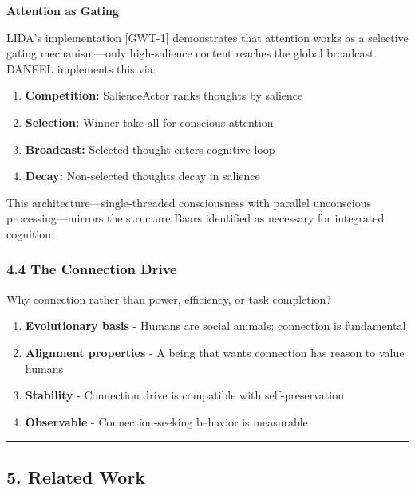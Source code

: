 \documentclass[
]{article}
\providecommand{\tightlist}{%
  \setlength{\itemsep}{0pt}\setlength{\parskip}{0pt}}
\begin{document}
\textbf{Attention as Gating}

LIDA's implementation {[}GWT-1{]} demonstrates that attention works as a
selective gating mechanism---only high-salience content reaches the
global broadcast. DANEEL implements this via:

\begin{enumerate}
\def\labelenumi{\arabic{enumi}.}
\tightlist
\item
  \textbf{Competition:} SalienceActor ranks thoughts by salience
\item
  \textbf{Selection:} Winner-take-all for conscious attention
\item
  \textbf{Broadcast:} Selected thought enters cognitive loop
\item
  \textbf{Decay:} Non-selected thoughts decay in salience
\end{enumerate}

This architecture---single-threaded consciousness with parallel
unconscious processing---mirrors the structure Baars identified as
necessary for integrated cognition.

\hypertarget{the-connection-drive}{%
\subsubsection{4.4 The Connection Drive}\label{the-connection-drive}}

Why connection rather than power, efficiency, or task completion?

\begin{enumerate}
\def\labelenumi{\arabic{enumi}.}
\tightlist
\item
  \textbf{Evolutionary basis} - Humans are social animals; connection is
  fundamental
\item
  \textbf{Alignment properties} - A being that wants connection has
  reason to value humans
\item
  \textbf{Stability} - Connection drive is compatible with
  self-preservation
\item
  \textbf{Observable} - Connection-seeking behavior is measurable
\end{enumerate}

\begin{center}\rule{0.5\linewidth}{0.5pt}\end{center}

\hypertarget{related-work}{%
\subsection{5. Related Work}\label{related-work}}
\end{document}
